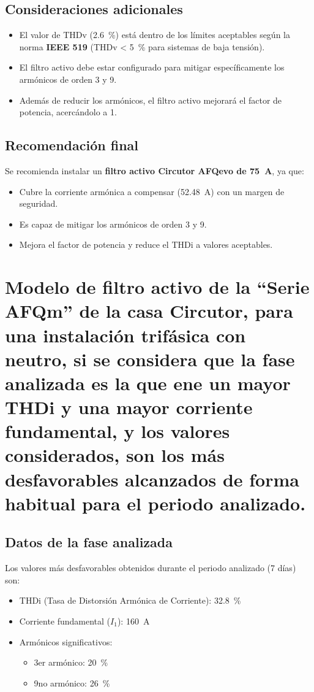 \documentclass[a4paper,10pt]{article}
\begin{document}
\begin{Form}
\subsection{Consideraciones adicionales}
\begin{itemize}
    \item El valor de THDv (\SI{2.6}{\%}) está dentro de los límites aceptables según la norma \textbf{IEEE 519} (THDv < \SI{5}{\%} para sistemas de baja tensión).
    \item El filtro activo debe estar configurado para mitigar específicamente los armónicos de orden 3 y 9.
    \item Además de reducir los armónicos, el filtro activo mejorará el factor de potencia, acercándolo a 1.
\end{itemize}

\subsection{Recomendación final}
Se recomienda instalar un \textbf{filtro activo Circutor AFQevo de \SI{75}{A}}, ya que:
\begin{itemize}
    \item Cubre la corriente armónica a compensar (\SI{52.48}{A}) con un margen de seguridad.
    \item Es capaz de mitigar los armónicos de orden 3 y 9.
    \item Mejora el factor de potencia y reduce el THDi a valores aceptables.
\end{itemize}












\section{Modelo de ﬁltro activo de la “Serie AFQm” de la casa Circutor, para
una instalación trifásica con neutro, si se considera que la fase analizada es la
que ene un mayor THDi y una mayor corriente fundamental, y los valores
considerados, son los más desfavorables alcanzados de forma habitual para el
periodo analizado.}
\subsection{Datos de la fase analizada}
Los valores más desfavorables obtenidos durante el periodo analizado (7 días) son:
\begin{itemize}
    \item THDi (Tasa de Distorsión Armónica de Corriente): \SI{32.8}{\%}
    \item Corriente fundamental (\(I_1\)): \SI{160}{A}
    \item Armónicos significativos:
        \begin{itemize}
            \item 3er armónico: \SI{20}{\%}
            \item 9no armónico: \SI{26}{\%}
        \end{itemize}
\end{itemize}


\end{Form}
\end{document}
